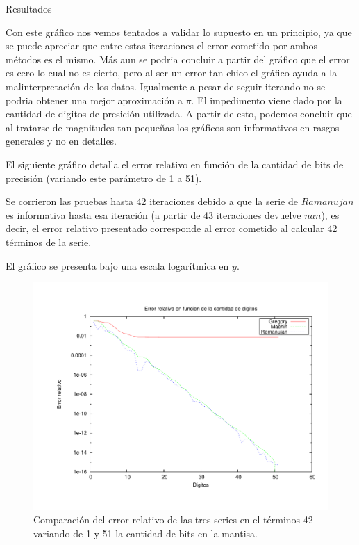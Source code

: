 \begin{section}{Resultados}
	\VSP
	
	Con este gráfico nos vemos tentados a validar lo supuesto en un principio, ya que se puede apreciar que entre estas iteraciones el error cometido por ambos métodos es el mismo. Más aun se podria concluir a partir del gráfico que el error es cero lo cual no es cierto, pero al ser un error tan chico el gráfico ayuda a la malinterpretación de los datos. Igualmente a pesar de seguir iterando no se podria obtener una mejor aproximación a $\pi$. El impedimento viene dado por la cantidad de digitos de presición utilizada.
	A partir de esto, podemos concluir que al tratarse de magnitudes tan pequeñas los gráficos son informativos en rasgos generales y no en detalles.\\	
	
	\VSP
	
	El siguiente gráfico detalla el error relativo en función de la cantidad de bits de precisión (variando este parámetro de 1 a 51).
	
	Se corrieron las pruebas hasta 42 iteraciones debido a que la serie de $Ramanujan$ es informativa hasta esa iteración (a partir de 43 iteraciones devuelve $nan$), es decir, el error relativo presentado corresponde al error cometido al calcular 42 términos de la serie.
	
	El gráfico se presenta bajo una escala logarítmica en $y$.
	
	\begin{figure}[H]
	  \centering
		\includegraphics[width=14cm]{graficos/comparacion_42it_1a51p.pdf}
	  \caption{Comparación del error relativo de las tres series en el términos 42 variando de 1 y 51 la cantidad de bits en la mantisa.}
	  \label{fig:42it}
	\end{figure}
	

\end{section}
